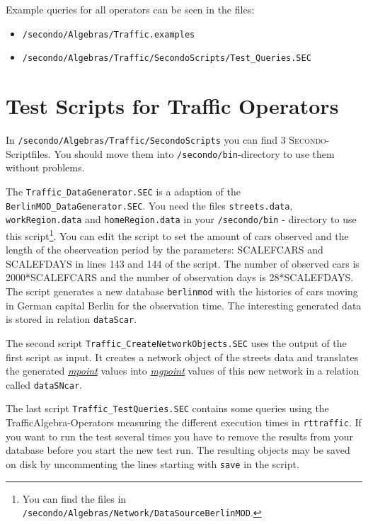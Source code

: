 \documentclass[a4paper,10pt]{article}
\newcommand{\secondo}{\textsc{Secondo}}
\newcommand{\dt}[1]{\textsl{\underline{#1}}}
\newcommand{\file}[1]{\texttt{#1}}
\begin{document}
Example queries for all operators can be seen in the files:
\begin{itemize}
  \item \file{/secondo/Algebras/Traffic.examples}
  \item \file{/secondo/Algebras/Traffic/SecondoScripts/Test\_Queries.SEC}
\end{itemize}

\section{Test Scripts for Traffic Operators}
In \file{/secondo/Algebras/Traffic/SecondoScripts} you can find 3 \secondo{}-Scriptfiles. You should move them into \file{/secondo/bin}-directory to use them without problems.

The \file{Traffic\_DataGenerator.SEC} is a adaption of the \file{BerlinMOD\_DataGenerator.SEC}. You need the files  \file{streets.data}, \file{workRegion.data} and \file{homeRegion.data} in your \file{/secondo/bin} - directory to use this script\footnote{You can find the files in \file{/secondo/Algebras/Network/DataSourceBerlinMOD}.}. You can edit the script to set the amount of cars observed and the length of the observeation period by the parameters: SCALEFCARS and SCALEFDAYS in lines 143 and 144 of the script. The number of observed cars is 2000*SCALEFCARS and the number of observation days is 28*SCALEFDAYS. The script generates a new database \file{berlinmod} with the histories of cars moving in German capital Berlin for the observation time. The interesting generated data is stored in relation \file{dataScar}.

The second script \file{Traffic\_CreateNetworkObjects.SEC} uses the output of the first script as input. It creates a network object of the streets data and translates the generated \dt{mpoint} values into \dt{mgpoint} values of this new network in a relation called \file{dataSNcar}.

The last script \file{Traffic\_TestQueries.SEC} contains some queries using the TrafficAlgebra-Operators measuring the different execution times in \file{rttraffic}. If you want to run the test several times you have to remove the results from your database before you start the new test run. The resulting objects may be saved on disk by uncommenting the lines starting with \file{save} in the script. 
\end{document}
